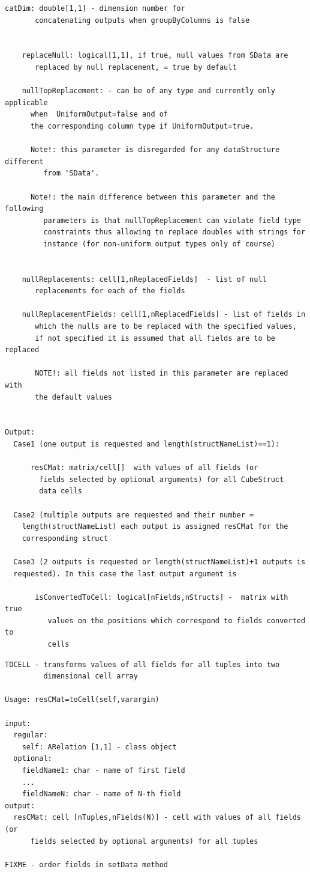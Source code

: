 \documentclass[letterpaper,10pt,english]{sphinxmanual}
\begin{document}
\begin{Verbatim}[commandchars=\\\{\}]
    catDim: double[1,1] - dimension number for
       concatenating outputs when groupByColumns is false


    replaceNull: logical[1,1], if true, null values from SData are
       replaced by null replacement, = true by default

    nullTopReplacement: - can be of any type and currently only applicable
      when  UniformOutput=false and of
      the corresponding column type if UniformOutput=true.

      Note!: this parameter is disregarded for any dataStructure different
         from 'SData'.

      Note!: the main difference between this parameter and the following
         parameters is that nullTopReplacement can violate field type
         constraints thus allowing to replace doubles with strings for
         instance (for non-uniform output types only of course)


    nullReplacements: cell[1,nReplacedFields]  - list of null
       replacements for each of the fields

    nullReplacementFields: cell[1,nReplacedFields] - list of fields in
       which the nulls are to be replaced with the specified values,
       if not specified it is assumed that all fields are to be replaced

       NOTE!: all fields not listed in this parameter are replaced with
       the default values


Output:
  Case1 (one output is requested and length(structNameList)==1):

      resCMat: matrix/cell[]  with values of all fields (or
        fields selected by optional arguments) for all CubeStruct
        data cells

  Case2 (multiple outputs are requested and their number =
    length(structNameList) each output is assigned resCMat for the
    corresponding struct

  Case3 (2 outputs is requested or length(structNameList)+1 outputs is
  requested). In this case the last output argument is

       isConvertedToCell: logical[nFields,nStructs] -  matrix with true
          values on the positions which correspond to fields converted to
          cells
\end{Verbatim}
\label{chap_func:smartdb-relations-atypifiedstaticrelation-tocell}
\begin{Verbatim}[commandchars=\\\{\}]
TOCELL - transforms values of all fields for all tuples into two
         dimensional cell array

Usage: resCMat=toCell(self,varargin)

input:
  regular:
    self: ARelation [1,1] - class object
  optional:
    fieldName1: char - name of first field
    ...
    fieldNameN: char - name of N-th field
output:
  resCMat: cell [nTuples,nFields(N)] - cell with values of all fields (or
      fields selected by optional arguments) for all tuples

FIXME - order fields in setData method
\end{Verbatim}
\end{document}
